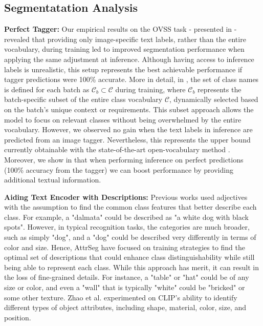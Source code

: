 \subsection{Segmentatation Analysis} \label{sec:text}
\textbf{Perfect Tagger:} Our empirical results on the OVSS task - presented in  - revealed that providing only image-specific text labels, %
rather than the entire vocabulary, during training led to improved segmentation performance when applying the same adjustment at inference. Although having access to inference labels is unrealistic, this setup represents the best achievable performance if tagger predictions were 100\% accurate. 
More in detail, in , the set of class names is defined for each batch as \(\mathcal{C}_b \subset \mathcal{C}\) during training, where \(\mathcal{C}_b\) represents the batch-specific subset of the entire class vocabulary \(\mathcal{C}\), dynamically selected based on the batch's unique context or requirements. This subset approach allows the model to focus on relevant classes without being overwhelmed by the entire vocabulary. However, we observed no gain when the text labels in inference are predicted from an image tagger. Nevertheless, this represents the upper bound currently obtainable with the state-of-the-art open-vocabulary method \cite{cho2024cat}. Moreover, we show in  that when performing inference on perfect predictions (100\% accuracy from the tagger) we can boost performance by providing additional textual information.

\textbf{Aiding Text Encoder with Descriptions:} Previous works \cite{ma2024open} used adjectives with the assumption to find the common class features that better describe each class. For example, a "dalmata" could be described as "a white dog with black spots". However, in typical recognition tasks, the categories are much broader, such as simply "dog", and a "dog" could be described very differently in terms of color and size. Hence, AttrSeg \cite{ma2024open} have focused on training strategies to find the optimal set of descriptions that could enhance class distinguishability while still being able to represent each class. While this approach has merit, it can result in the loss of fine-grained details. For instance, a "table" or "hat" could be of any size or color, and even a "wall" that is typically "white" could be "bricked" or some other texture.
Zhao et al. \cite{zhao2024gradient} experimented on CLIP's ability to identify different types of object attributes, including shape, material, color, size, and position. 

